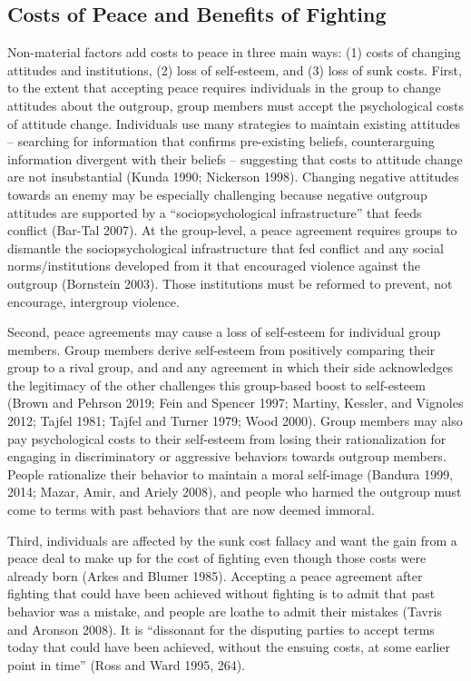 \documentclass[11pt]{article}
\begin{document}
\hypertarget{costs-of-peace-and-benefits-of-fighting}{%
\subsection{Costs of Peace and Benefits of
Fighting}\label{costs-of-peace-and-benefits-of-fighting}}

Non-material factors add costs to peace in three main ways: (1) costs of
changing attitudes and institutions, (2) loss of self-esteem, and (3)
loss of sunk costs. First, to the extent that accepting peace requires
individuals in the group to change attitudes about the outgroup, group
members must accept the psychological costs of attitude change.
Individuals use many strategies to maintain existing attitudes --
searching for information that confirms pre-existing beliefs,
counterarguing information divergent with their beliefs -- suggesting
that costs to attitude change are not insubstantial (Kunda 1990;
Nickerson 1998). Changing negative attitudes towards an enemy may be
especially challenging because negative outgroup attitudes are supported
by a ``sociopsychological infrastructure'' that feeds conflict (Bar-Tal
2007). At the group-level, a peace agreement requires groups to
dismantle the sociopsychological infrastructure that fed conflict and
any social norms/institutions developed from it that encouraged violence
against the outgroup (Bornstein 2003). Those institutions must be
reformed to prevent, not encourage, intergroup violence.

Second, peace agreements may cause a loss of self-esteem for individual
group members. Group members derive self-esteem from positively
comparing their group to a rival group, and and any agreement in which
their side acknowledges the legitimacy of the other challenges this
group-based boost to self-esteem (Brown and Pehrson 2019; Fein and
Spencer 1997; Martiny, Kessler, and Vignoles 2012; Tajfel 1981; Tajfel
and Turner 1979; Wood 2000). Group members may also pay psychological
costs to their self-esteem from losing their rationalization for
engaging in discriminatory or aggressive behaviors towards outgroup
members. People rationalize their behavior to maintain a moral
self-image (Bandura 1999, 2014; Mazar, Amir, and Ariely 2008), and
people who harmed the outgroup must come to terms with past behaviors
that are now deemed immoral.

Third, individuals are affected by the sunk cost fallacy and want the
gain from a peace deal to make up for the cost of fighting even though
those costs were already born (Arkes and Blumer 1985). Accepting a peace
agreement after fighting that could have been achieved without fighting
is to admit that past behavior was a mistake, and people are loathe to
admit their mistakes (Tavris and Aronson 2008). It is ``dissonant for
the disputing parties to accept terms today that could have been
achieved, without the ensuing costs, at some earlier point in time''
(Ross and Ward 1995, 264).
\end{document}

